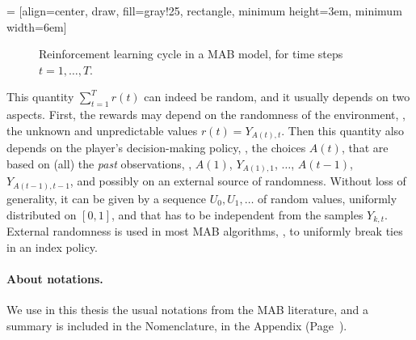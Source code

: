  = [align=center, draw, fill=gray!25, rectangle, minimum height=3em, minimum width=6em]
\begin{figure}[h!]
    \centering
\caption{Reinforcement learning cycle in a MAB model, for time steps $t=1,\dots,T$.}
\label{fig:2:ReinforcementLearningCycleMABmodel}
\end{figure}


\label{par:2:externalrandomness}
This quantity $\sum_{t=1}^T r(t)$ can indeed be random, and it usually depends on two aspects.
First, the rewards may depend on the randomness of the environment, \ie, the unknown and unpredictable values $r(t)=Y_{A(t),t}$.
Then this quantity also depends on the player's decision-making policy, \ie, the choices $A(t)$, that are based on (all) the \emph{past} observations, \ie, $A(1)$, $Y_{A(1),1}$, $\dots$, $A(t-1)$, $Y_{A(t-1),t-1}$, and possibly on an external source of randomness.
%
Without loss of generality, it can be given by a sequence $U_0,U_1,\dots$ of \iid{} random values, uniformly distributed on $[0,1]$, and that has to be independent from the samples $Y_{k,t}$.
External randomness is used in most MAB algorithms, \eg, to uniformly break ties in an index policy.


\paragraph{About notations.}
%
We use in this thesis the usual notations from the MAB literature,
and a summary is included in the Nomenclature, in the Appendix (Page~\pageref{chapter:nomenclature}).


